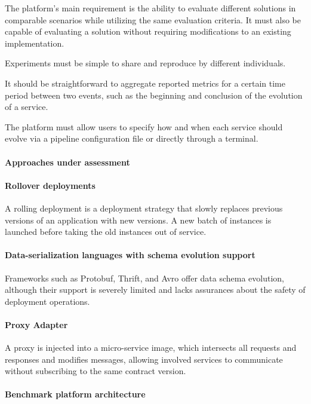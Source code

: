 The platform's main requirement is the ability to evaluate different solutions in comparable scenarios while utilizing the same evaluation criteria. It must also be capable of evaluating a solution without requiring modifications to an existing implementation.

Experiments must be simple to share and reproduce by different individuals.

It should be straightforward to aggregate reported metrics for a certain time period between two events, such as the beginning and conclusion of the evolution of a service.

The platform must allow users to specify how and when each service should evolve via a pipeline configuration file or directly through a terminal.

\paragraph{Approaches under assessment}

\paragraph{Rollover deployments}
A rolling deployment is a deployment strategy that slowly replaces previous versions of an application with new versions.
A new batch of instances is launched before taking the old instances out of service.

\paragraph{Data-serialization languages with schema evolution support }
Frameworks such as Protobuf, Thrift, and Avro offer data schema evolution, although their support is severely limited and lacks assurances about the safety of deployment operations.

\paragraph{Proxy Adapter}
A proxy is injected into a micro-service image, which intersects all requests and responses and modifies messages, allowing involved services to communicate without subscribing to the same contract version.

\paragraph{Benchmark platform architecture}

